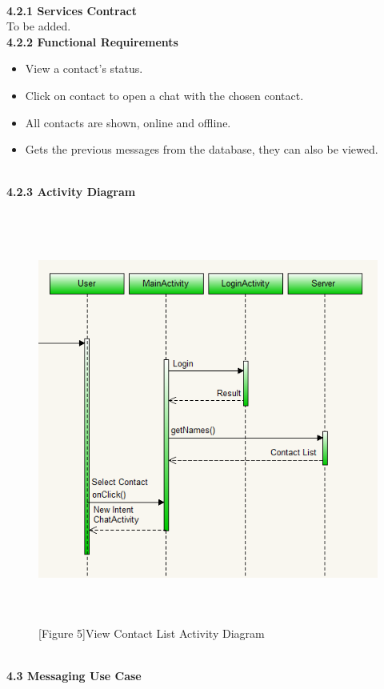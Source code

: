 \documentclass[29pt,a4paper]{moderncv}
\begin{document}
		\\ \noindent\textbf{4.2.1 Services Contract}\\
		To be added.\\
		
		\noindent\textbf{4.2.2 Functional Requirements}
			\begin{itemize}
				\item View a contact’s status.
				\item Click on contact to open a chat with the chosen contact.
				\item All contacts are shown, online and offline.
				\item Gets the previous messages from the database, they can also be viewed.\\
			\end{itemize}
\newpage
		\\ \left\textbf{4.2.3 Activity Diagram} \\
			\begin{figure}
				\centering
				 \\ \includegraphics[width=5.5in, height=5.0in]{./viewContactsActivity.png}
				\\\caption{[Figure 5]View Contact List Activity Diagram}
			\end{figure}	
\newpage
	\\ \left\textbf{4.3 Messaging Use Case} \\
\end{document}
